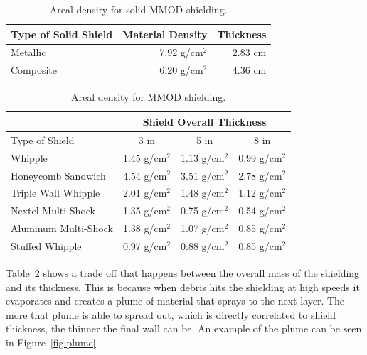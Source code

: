 \documentclass[paper=letter, fontsize=11pt]{scrartcl} %
\numberwithin{equation}{section} %
\numberwithin{figure}{section} %
\numberwithin{table}{section} %
\begin{document}
\begin{table}[H]
    \begin{centering}
        \begin{tabular}{lrr}
            \toprule
            Type of Solid Shield & Material Density & Thickness \\
            \midrule
            Metallic             & 7.92 g/cm$^2$    & 2.83 cm   \\
            Composite            & 6.20 g/cm$^2$    & 4.36 cm   \\
            \bottomrule
        \end{tabular}
        \caption{Areal density for solid MMOD shielding.}
        \label{table:solidMMOD}
    \end{centering}
\end{table}

\begin{table}[H]
    \begin{centering}
        \begin{tabular}{lccc}
            \toprule
            & \multicolumn{3}{c}{Shield Overall Thickness}  \\
            \midrule
            Type of Shield       & 3 in          & 5 in          & 8 in          \\ \hline
            Whipple              & 1.45 g/cm$^2$ & 1.13 g/cm$^2$ & 0.99 g/cm$^2$ \\
            Honeycomb Sandwich   & 4.54 g/cm$^2$ & 3.51 g/cm$^2$ & 2.78 g/cm$^2$ \\
            Triple Wall Whipple  & 2.01 g/cm$^2$ & 1.48 g/cm$^2$ & 1.12 g/cm$^2$ \\
            Nextel Multi-Shock   & 1.35 g/cm$^2$ & 0.75 g/cm$^2$ & 0.54 g/cm$^2$ \\
            Aluminum Multi-Shock & 1.38 g/cm$^2$ & 1.07 g/cm$^2$ & 0.85 g/cm$^2$ \\
            Stuffed Whipple      & 0.97 g/cm$^2$ & 0.88 g/cm$^2$ & 0.85 g/cm$^2$ \\
            \bottomrule
        \end{tabular}
        \caption{Areal density for MMOD shielding.}
        \label{table:MMOD}
    \end{centering}
\end{table}

Table~\ref{table:MMOD} shows a trade off that happens between the overall mass of the shielding and its thickness. This is because when debris hits the shielding at high speeds it evaporates and creates a plume of material that sprays to the next layer. The more that plume is able to spread out, which is directly correlated to shield thickness, the thinner the final wall can be. An example of the plume can be seen in Figure~\ref{fig:plume}.
\end{document}
